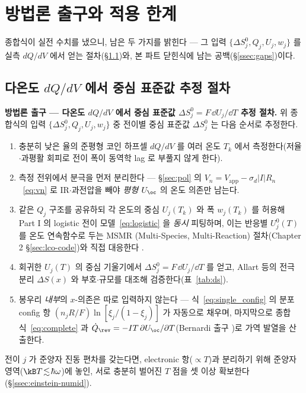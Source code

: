 \section{방법론 출구와 적용 한계}\label{sec:method}

종합식이 실전 수치를 냈으니, 남은 두 가지를 밝힌다 --- 그 입력 $\{\Delta S^0_j,Q_j,U_j,w_j\}$ 를 실측
$dQ/dV$ 에서 얻는 절차(\S\ref{ssec:procedure})와, 본 파트 닫힌식에 남는 공백(\S\ref{ssec:gaps})이다.

\subsection{다온도 $dQ/dV$ 에서 중심 표준값 추정 절차}\label{ssec:procedure}
\begin{procedurebox}
\textbf{방법론 출구 --- 다온도 $dQ/dV$ 에서 중심 표준값 $\Delta S^0_j=F\,\dd U_j/\dd T$ 추정 절차.} 위 종합식의
입력 $\{\Delta S^0_j,Q_j,U_j,w_j\}$ 중 전이별 중심 표준값 $\Delta S^0_j$ 는 다음 순서로 추정한다.
\begin{enumerate}[leftmargin=1.8em,itemsep=2pt,topsep=2pt]
\item 충분히 낮은 율의 준평형 코인 하프셀 $dQ/dV$ 를 여러 온도 $T_k$ 에서 측정한다(저율$\cdot$과평활 회피로
전이 폭이 동역학 lag 로 부풀지 않게 한다).
\item 측정 전위에서 분극을 먼저 분리한다 --- \S\ref{sec:pol} 의 $V_n=V_\mathrm{app}-\sigma_d|I|R_n$~\eqref{eq:vn} 로
IR$\cdot$과전압을 빼야 \emph{평형} $U_\oc$ 의 온도 의존만 남는다.
\item 같은 $Q_j$ 구조를 공유하되 각 온도의 중심 $U_j(T_k)$ 와 폭 $w_j(T_k)$ 를 허용해 Part I 의 logistic
전이 모델~\eqref{eq:logistic} 을 \emph{동시} 피팅하며, 이는 반응별 $U_j^0(T)$ 를 온도 연속함수로 두는 MSMR
(Multi-Species, Multi-Reaction) 절차(Chapter 2 \S\ref{sec:lco-code})와 직접 대응한다 \cite{msmr_partI,msmr_partII}.
\item 회귀한 $U_j(T)$ 의 중심 기울기에서 $\Delta S^0_j=F\,\dd U_j/\dd T$ 를 얻고, Allart 등의 전극 분리
$\Delta S(x)$ \cite{allart2018} 와 부호$\cdot$규모를 대조해 검증한다(표~\ref{tab:ds}).
\item 봉우리 \emph{내부}의 $x$-의존은 따로 입력하지 않는다 --- 식~\eqref{eq:single_config} 의 분포 config 항
$(n_jR/F)\ln[\xi_j/(1-\xi_j)]$ 가 자동으로 채우며, 마지막으로 종합식~\eqref{eq:complete} 과
$\dot Q_\rev=-IT\,\partial U_\oc/\partial T$(Bernardi 출구 \cite{bernardi1985})로 가역 발열을 산출한다.
\end{enumerate}
전이 $j$ 가 준양자 진동 편차를 갖는다면, electronic 항($\propto T$)과 분리하기 위해 준양자 영역($\kB
T\!\lesssim\!\hbar\omega$)에 놓인, 서로 충분히 벌어진 $T$ 점을 셋 이상 확보한다(\S\ref{ssec:einstein-numid}).
\end{procedurebox}

